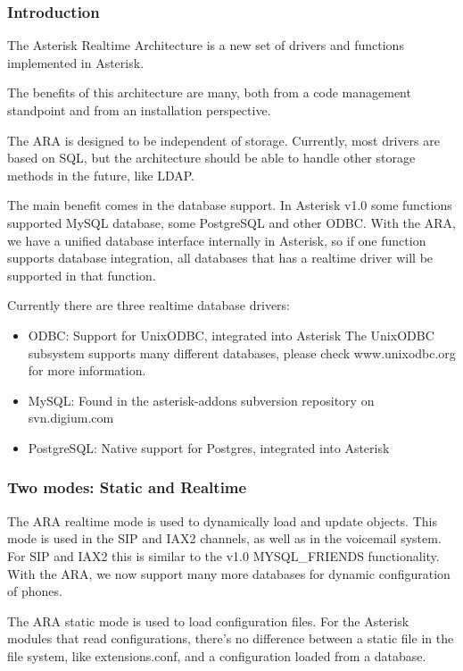 \subsubsection{Introduction}

The Asterisk Realtime Architecture is a new set of drivers and 
functions implemented in Asterisk.

The benefits of this architecture are many, both from a code management
standpoint and from an installation perspective. 

The ARA is designed to be independent of storage. Currently, most
drivers are based on SQL, but the architecture should be able to handle
other storage methods in the future, like LDAP.

The main benefit comes in the database support. In Asterisk v1.0 some 
functions supported MySQL database, some PostgreSQL and other ODBC.
With the ARA, we have a unified database interface internally in Asterisk,
so if one function supports database integration, all databases that has a 
realtime driver will be supported in that function.

Currently there are three realtime database drivers:

\begin{itemize}
  \item ODBC: Support for UnixODBC, integrated into Asterisk
        The UnixODBC subsystem supports many different databases,
        please check www.unixodbc.org for more information.
  \item MySQL: Found in the asterisk-addons subversion repository on svn.digium.com
  \item PostgreSQL: Native support for Postgres, integrated into Asterisk
\end{itemize}

\subsubsection{Two modes: Static and Realtime}

The ARA realtime mode is used to dynamically load and update objects.
This mode is used in the SIP and IAX2 channels, as well as in the voicemail
system. For SIP and IAX2 this is similar to the v1.0 MYSQL\_FRIENDS 
functionality. With the ARA, we now support many more databases for
dynamic configuration of phones.

The ARA static mode is used to load configuration files. For the Asterisk
modules that read configurations, there's no difference between a static
file in the file system, like extensions.conf, and a configuration loaded
from a database.

